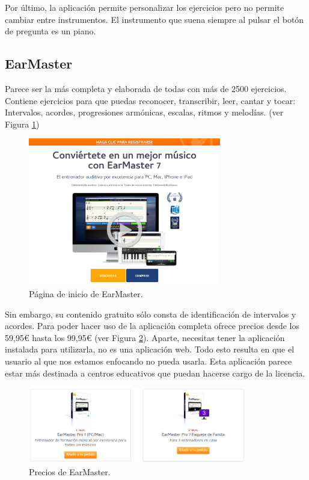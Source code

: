 \documentclass[12pt,twoside,titlepage]{report}
\begin{document}
Por último, la aplicación permite personalizar los ejercicios pero no permite cambiar entre instrumentos. El instrumento que suena siempre al pulsar el botón de pregunta es un piano.
\cite{tonedear2}

\subsection{EarMaster}
\label{sec:EarMaster}

Parece ser la más completa y elaborada de todas con más de 2500 ejercicios. Contiene ejercicios para que puedas reconocer, transcribir, leer, cantar y tocar: Intervalos, acordes, progresiones armónicas, escalas, ritmos y melodías.
(ver Figura \ref{fig:earmaster})
\cite{earmaster1}

\begin{figure}[H] 
    \includegraphics[width=0.75\textwidth]{Estado del Arte/earmaster}
    \centering
    \caption{Página de inicio de EarMaster.}
    \label{fig:earmaster}
\end{figure}

Sin embargo, su contenido gratuito sólo consta de identificación de intervalos y acordes. Para poder hacer uso de la aplicación completa ofrece precios desde los 59,95€ hasta los 99,95€ (ver Figura \ref{fig:earmasterprices}). Aparte, necesitas tener la aplicación instalada para utilizarla, no es una aplicación web. Todo esto resulta en que el usuario al que nos estamos enfocando no pueda usarla. Esta aplicación parece estar más destinada a centros educativos que puedan hacerse cargo de la licencia.
\cite{earmaster2}

\begin{figure}[H] 
    \includegraphics[width=0.85\textwidth]{Estado del Arte/earmasterprices}
    \centering
    \caption{Precios de EarMaster.}
    \label{fig:earmasterprices}
\end{figure}
\end{document}
